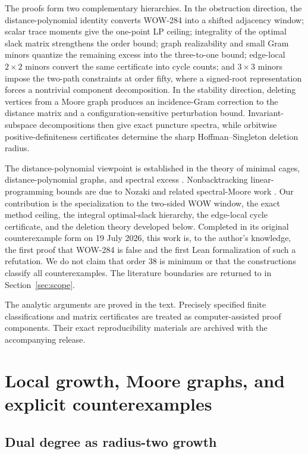 \documentclass[a4paper,10pt,reqno]{amsart}
\theoremstyle{plain}
\theoremstyle{definition}
\theoremstyle{remark}
\begin{document}
The proofs form two complementary hierarchies.  In the obstruction direction,
the distance-polynomial identity converts WOW-284 into a shifted adjacency
window; scalar trace moments give the one-point LP ceiling; integrality of the
optimal slack matrix strengthens the order bound; graph realizability and
 small Gram minors quantize the remaining excess into the three-to-one bound;
edge-local \(2\times2\) minors convert the same certificate into cycle counts;
and \(3\times3\) minors impose the two-path constraints at order fifty, where
a signed-root representation forces a nontrivial component decomposition.
In the stability
direction, deleting vertices from a Moore graph produces an incidence-Gram
correction to the distance matrix and a configuration-sensitive perturbation
bound.
Invariant-subspace decompositions then give exact puncture spectra, while
orbitwise positive-definiteness certificates determine the sharp
Hoffman--Singleton deletion radius.

The distance-polynomial viewpoint is established in the theory of minimal
cages, distance-polynomial graphs, and spectral excess
\cite{HowladerPanigrahi2022,Fiol2016}.  Nonbacktracking linear-programming
bounds are due to Nozaki and related spectral-Moore work
\cite{Nozaki2015,CioabaEtAl2016}.  Our contribution is the specialization to
the two-sided WOW window, the exact method ceiling, the integral
optimal-slack hierarchy, the edge-local cycle certificate, and the deletion
theory developed below.  Completed in its original counterexample form on
19 July 2026, this work is, to the author's knowledge, the first proof that WOW-284 is false
and the first Lean formalization of such a refutation.  We
do not claim that order \(38\) is minimum or that the constructions classify
all counterexamples.
The literature boundaries are returned to in Section~\ref{sec:scope}.

The analytic arguments are proved in the text.  Precisely specified finite
classifications and matrix certificates are treated as computer-assisted proof
components.  Their exact reproducibility materials are archived with the
accompanying release.

\section{Local growth, Moore graphs, and explicit counterexamples}
\label{sec:examples}

\subsection{Dual degree as radius-two growth}
\end{document}
